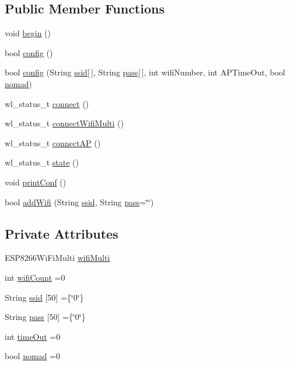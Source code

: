 \subsection*{Public Member Functions}
\begin{DoxyCompactItemize}
\item 
void \hyperlink{class_cool_wifi_a46942fed90e475112cc10b78a32e7aaa}{begin} ()
\item 
bool \hyperlink{class_cool_wifi_a4eb2f6b9b09dd588964b88b6c70122c0}{config} ()
\item 
bool \hyperlink{class_cool_wifi_a2a9a546f76816c8c5c8e2d46a6c4f07d}{config} (String \hyperlink{class_cool_wifi_a893b21d0fed821438733bba2e73fb4c2}{ssid}\mbox{[}$\,$\mbox{]}, String \hyperlink{class_cool_wifi_a0c3332a149245aaad060b32593a54c9b}{pass}\mbox{[}$\,$\mbox{]}, int wifi\+Number, int A\+P\+Time\+Out, bool \hyperlink{class_cool_wifi_ab7d9643c4af7bac3be331ef008b2ea27}{nomad})
\item 
wl\+\_\+status\+\_\+t \hyperlink{class_cool_wifi_ad060353050f40d032a2dbf9e54a768bf}{connect} ()
\item 
wl\+\_\+status\+\_\+t \hyperlink{class_cool_wifi_a419de92d738f14b7444cf822b3ab0070}{connect\+Wifi\+Multi} ()
\item 
wl\+\_\+status\+\_\+t \hyperlink{class_cool_wifi_a7c857f27161782f5ef1d62d552aff971}{connect\+AP} ()
\item 
wl\+\_\+status\+\_\+t \hyperlink{class_cool_wifi_a1c7b4d82a4098d346e7593dce92039fa}{state} ()
\item 
void \hyperlink{class_cool_wifi_a9e6105c6d13d35ec510f6633da9e0223}{print\+Conf} ()
\item 
bool \hyperlink{class_cool_wifi_a914d7a1df14dd6b75345fb614c34e9d6}{add\+Wifi} (String \hyperlink{class_cool_wifi_a893b21d0fed821438733bba2e73fb4c2}{ssid}, String \hyperlink{class_cool_wifi_a0c3332a149245aaad060b32593a54c9b}{pass}=\char`\"{}\char`\"{})
\end{DoxyCompactItemize}
\subsection*{Private Attributes}
\begin{DoxyCompactItemize}
\item 
E\+S\+P8266\+Wi\+Fi\+Multi \hyperlink{class_cool_wifi_a7862a8c0d7239877e2956c14a368aab8}{wifi\+Multi}
\item 
int \hyperlink{class_cool_wifi_ab133bd92fcb895b884deecd6678592e4}{wifi\+Count} =0
\item 
String \hyperlink{class_cool_wifi_a893b21d0fed821438733bba2e73fb4c2}{ssid} \mbox{[}50\mbox{]} =\{\char`\"{}0\char`\"{}\}
\item 
String \hyperlink{class_cool_wifi_a0c3332a149245aaad060b32593a54c9b}{pass} \mbox{[}50\mbox{]} =\{\char`\"{}0\char`\"{}\}
\item 
int \hyperlink{class_cool_wifi_a952111605f25156588b5632caaba1c6f}{time\+Out} =0
\item 
bool \hyperlink{class_cool_wifi_ab7d9643c4af7bac3be331ef008b2ea27}{nomad} =0
\end{DoxyCompactItemize}



